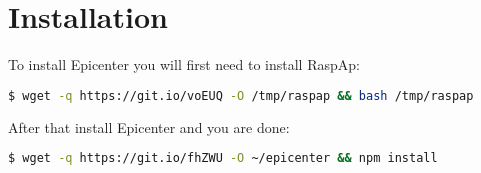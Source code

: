 \section{Installation}
To install Epicenter you will first need to install RaspAp:
\begin{lstlisting}[language=bash]
$ wget -q https://git.io/voEUQ -O /tmp/raspap && bash /tmp/raspap
\end{lstlisting}

After that install Epicenter and you are done:
\begin{lstlisting}[language=bash]
$ wget -q https://git.io/fhZWU -O ~/epicenter && npm install
\end{lstlisting}
